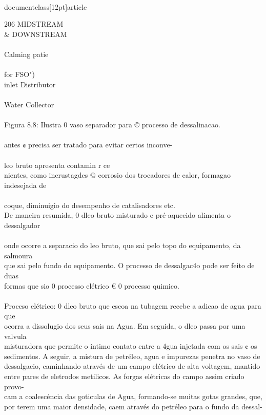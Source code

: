 \\documentclass[12pt]{article}
\begin{document}
206 MIDSTREAM \\& DOWNSTREAM\\
\\
Calming patie\\
\\{for FSO")\\
inlet Distributor\\
\\
Water Collector\\
\\
Figura 8.8: Ilustra 0 vaso separador para © processo de dessalinacao.\\
\\
antes ¢ precisa ser tratado para evitar certos inconve-\\
\\
leo bruto apresenta contamin r ce\\
nientes, como incrustagdes @ corrosio dos trocadores de calor, formagao indesejada de\\
\\
coque, diminuigio do desempenho de catalisadores etc.\\
De maneira resumida, 0 dleo bruto misturado e pré-aquecido alimenta o dessalgador\\
\\
onde ocorre a separacio do leo bruto, que sai pelo topo do equipamento, da salmoura\\
que sai pelo fundo do equipamento. O processo de dessalgac4o pode ser feito de duas\\
formas que sio 0 processo elétrico € 0 processo quimico.\\
\\
Proceso elétrico: 0 dleo bruto que escoa na tubagem recebe a adicao de agua para que\\
ocorra a dissolugio dos seus sais na Agua. Em seguida, o dleo passa por uma valvula\\
misturadora que permite o intimo contato entre a 4gua injetada com os sais ¢ os\\
sedimentos. A seguir, a mistura de petréleo, agua e impurezas penetra no vaso de\\
dessalgacio, caminhando através de um campo elétrico de alta voltagem, mantido\\
entre pares de eletrodos metilicos. As forgas elétricas do campo assim criado provo-\\
cam a coalescéncia das goticulas de Agua, formando-se muitas gotas grandes, que,\\
por terem uma maior densidade, caem através do petréleo para o fundo da dessal-\\
}
\end{document}
